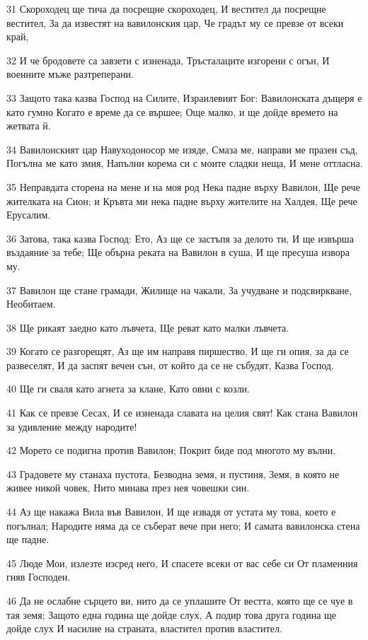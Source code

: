\par 31 Скороходец ще тича да посрещне скороходец, И вестител да посрещне вестител, За да известят на вавилонския цар, Че градът му се превзе от всеки край,
\par 32 И че бродовете са завзети с изненада, Тръсталаците изгорени с огън, И военните мъже разтреперани.
\par 33 Защото така казва Господ на Силите, Израилевият Бог: Вавилонската дъщеря е като гумно Когато е време да се вършее; Още малко, и ще дойде времето на жетвата й.
\par 34 Вавилонският цар Навуходоносор ме изяде, Смаза ме, направи ме празен съд, Погълна ме като змия, Напълни корема си с моите сладки неща, И мене оттласна.
\par 35 Неправдата сторена на мене и на моя род Нека падне върху Вавилон, Ще рече жителката на Сион; и Кръвта ми нека падне върху жителите на Халдея, Ще рече Ерусалим.
\par 36 Затова, така казва Господ: Ето, Аз ще се застъпя за делото ти, И ще извърша въздаяние за тебе; Ще обърна реката на Вавилон в суша, И ще пресуша извора му.
\par 37 Вавилон ще стане грамади, Жилище на чакали, За учудване и подсвиркване, Необитаем.
\par 38 Ще рикаят заедно като лъвчета, Ще реват като малки лъвчета.
\par 39 Когато се разгорещят, Аз ще им направя пиршество, И ще ги опия, за да се развеселят, И да заспят вечен сън, от който да се не събудят, Казва Господ.
\par 40 Ще ги сваля като агнета за клане, Като овни с козли.
\par 41 Как се превзе Сесах, И се изненада славата на целия свят! Как стана Вавилон за удивление между народите!
\par 42 Морето се подигна против Вавилон; Покрит биде под многото му вълни.
\par 43 Градовете му станаха пустота, Безводна земя, и пустиня, Земя, в която не живее никой човек, Нито минава през нея човешки син.
\par 44 Аз ще накажа Вила във Вавилон, И ще извадя от устата му това, което е погълнал; Народите няма да се съберат вече при него; И самата вавилонска стена ще падне.
\par 45 Люде Мои, излезте изсред него, И спасете всеки от вас себе си От пламенния гняв Господен.
\par 46 Да не ослабне сърцето ви, нито да се уплашите От вестта, която ще се чуе в тая земя; Защото една година ще дойде слух, А подир това друга година ще дойде слух И насилие на страната, властител против властител.
